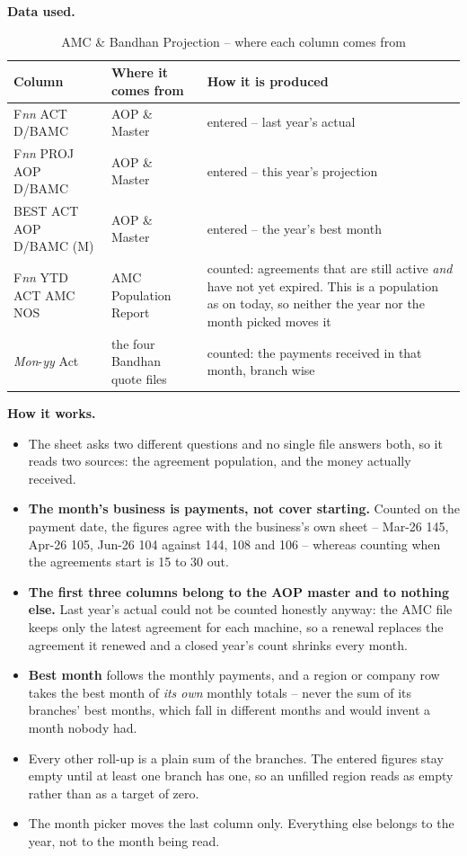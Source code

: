 \documentclass[11pt,a4paper]{article}
\newcommand{\dataused}{\textbf{Data used.}\par}
\newcommand{\devproc}{\textbf{How it works.}\par}
\begin{document}
\dataused
\begin{table}[H]\centering\small
\begin{tabularx}{\linewidth}{@{}p{4.6cm}p{3.4cm}X@{}}
\toprule
\textbf{Column} & \textbf{Where it comes from} & \textbf{How it is produced} \\
\midrule
F\textit{nn} ACT D/BAMC & AOP \& Master & entered -- last year's actual \\
F\textit{nn} PROJ AOP D/BAMC & AOP \& Master & entered -- this year's projection \\
BEST ACT AOP D/BAMC (M) & AOP \& Master & entered -- the year's best month \\
F\textit{nn} YTD ACT AMC NOS & AMC Population Report &
counted: agreements that are still active \emph{and} have not yet expired. This is a
population as on today, so neither the year nor the month picked moves it \\
\textit{Mon}-\textit{yy} Act & the four Bandhan quote files &
counted: the payments received in that month, branch wise \\
\bottomrule
\end{tabularx}
\caption{AMC \& Bandhan Projection -- where each column comes from}
\end{table}

\devproc
\begin{itemize}
  \item The sheet asks two different questions and no single file answers both, so it
  reads two sources: the agreement population, and the money actually received.
  \item \textbf{The month's business is payments, not cover starting.} Counted on the
  payment date, the figures agree with the business's own sheet -- Mar-26 145, Apr-26
  105, Jun-26 104 against 144, 108 and 106 -- whereas counting when the agreements start
  is 15 to 30 out.
  \item \textbf{The first three columns belong to the AOP master and to nothing else.}
  Last year's actual could not be counted honestly anyway: the AMC file keeps only the
  latest agreement for each machine, so a renewal replaces the agreement it renewed and a
  closed year's count shrinks every month.
  \item \textbf{Best month} follows the monthly payments, and a region or company row
  takes the best month of \emph{its own} monthly totals -- never the sum of its branches'
  best months, which fall in different months and would invent a month nobody had.
  \item Every other roll-up is a plain sum of the branches. The entered figures stay
  empty until at least one branch has one, so an unfilled region reads as empty rather
  than as a target of zero.
  \item The month picker moves the last column only. Everything else belongs to the year,
  not to the month being read.
\end{itemize}
\end{document}
